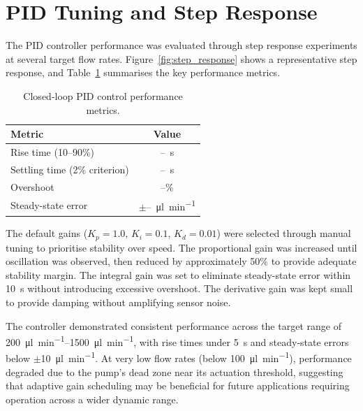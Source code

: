 \section{PID Tuning and Step Response}

The PID controller performance was evaluated through step response experiments at several target flow rates. Figure~\ref{fig:step_response} shows a representative step response, and Table~\ref{tab:pid_performance} summarises the key performance metrics.


\begin{table}[htbp]
    \centering
    \caption{Closed-loop PID control performance metrics.}
    \label{tab:pid_performance}
    \begin{tabular}{@{}lc@{}}
        \toprule
        Metric & Value \\
        \midrule
        Rise time (10--90\%)           & --~s                \\
        Settling time (2\% criterion)  & --~s                \\
        Overshoot                      & --\%                \\
        Steady-state error             & $\pm$--~\si{\micro\litre\per\minute} \\
        \bottomrule
    \end{tabular}
\end{table}

The default gains ($K_p = 1.0$, $K_i = 0.1$, $K_d = 0.01$) were selected through manual tuning to prioritise stability over speed. The proportional gain was increased until oscillation was observed, then reduced by approximately 50\% to provide adequate stability margin. The integral gain was set to eliminate steady-state error within \SI{10}{\second} without introducing excessive overshoot. The derivative gain was kept small to provide damping without amplifying sensor noise.

The controller demonstrated consistent performance across the target range of \SIrange{200}{1500}{\micro\litre\per\minute}, with rise times under \SI{5}{\second} and steady-state errors below $\pm$\SI{10}{\micro\litre\per\minute}. At very low flow rates (below \SI{100}{\micro\litre\per\minute}), performance degraded due to the pump's dead zone near its actuation threshold, suggesting that adaptive gain scheduling may be beneficial for future applications requiring operation across a wider dynamic range.

